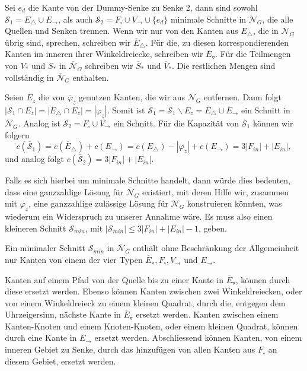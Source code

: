 Sei $e_{d}$ die Kante von der Dummy-Senke zu Senke 2, dann sind sowohl $\mathcal{S}_1 = E_\triangle \cup E_{\to}$, als auch $\mathcal{S}_2 = F_\square \cup V_{\to} \cup \{e_{d}\}$ minimale Schnitte in $\mathcal{N}_G$, die alle Quellen und Senken trennen. Wenn wir nur von den Kanten aus $E_\triangle$, die in $\overline{\mathcal{N}}_G$ übrig sind, sprechen, schreiben wir $\overline{E}_\triangle$. Für die, zu diesen korrespondierenden Kanten im inneren ihrer Winkeldreiecke, schreiben wir $\overline{E}_\triangledown$. Für die Teilmengen von $V_*$ und $S_*$ in $\overline{\mathcal{N}}_G$ schreiben wir $\overline{S}_*$ und $\overline{V}_*$. Die restlichen Mengen sind vollständig in $\overline{\mathcal{N}}_G$ enthalten.

Seien $E_z$ die von $\overline{\varphi}_z$ genutzen Kanten, die wir aus $\mathcal{N}_G$ entfernen. Dann folgt $|\mathcal{S}_1 \cap E_z| = |E_\triangle \cap E_z| = |\varphi_z|$. Somit ist $\overline{\mathcal{S}}_1 = \mathcal{S}_1 \backslash E_z = \overline{E}_\triangle \cup E_\to$ ein Schnitt in $\overline{\mathcal{N}}_G$. Analog ist $\overline{\mathcal{S}}_2 = F_\square \cup V_{\to}$ ein Schnitt. Für die Kapazität von $\overline{\mathcal{S}}_1$ können wir folgern 
$$ c(\overline{\mathcal{S}}_1) = c(\overline{E}_\triangle) + c(E_\to) = c(E_\triangle) - |\varphi_z| + c(E_\to) = 3|F_{in}| + |E_{in}|,$$
und analog folgt $c(\overline{\mathcal{S}}_2) = 3|F_{in}| + |E_{in}|$.

Falls es sich hierbei um minimale Schnitte handelt, dann würde dies bedeuten, dass eine ganzzahlige Lösung für $\overline{\mathcal{N}}_G$ existiert, mit deren Hilfe wir, zusammen mit $\varphi_z$, eine ganzzahlige zulässige Lösung für $\mathcal{N}_G$ konstruieren könnten, was wiederum ein Widerspruch zu unserer Annahme wäre. Es muss also einen kleineren Schnitt $\mathcal{S}_{min}$, mit $|\mathcal{S}_{min}| \leq 3|F_{in}| + |E_{in}| - 1$, geben. 

\begin{claim} \label{cut_types1}

Ein minimaler Schnitt $\mathcal{S}_{min}$ in $\overline{\mathcal{N}}_G$ enthält ohne Beschränkung der Allgemeinheit nur Kanten von einem der vier Typen $\overline{E}_\triangledown, F_\square, V_\to$ und $E_\to$.

\end{claim}

Kanten auf einem Pfad von der Quelle bis zu einer Kante in $\overline{E}_\triangledown$, können durch diese ersetzt werden. Ebenso können Kanten zwischen zwei Winkeldreiecken, oder von einem Winkeldreieck zu einem kleinen Quadrat, durch die, entgegen dem Uhrzeigersinn, nächste Kante in $\overline{E}_\triangledown$ ersetzt werden. Kanten zwischen einem Kanten-Knoten und einem Knoten-Knoten, oder einem kleinen Quadrat, können durch eine Kante in $E_\to$ ersetzt werden. Abschliessend können Kanten, von einem inneren Gebiet zu Senke, durch das hinzufügen von allen Kanten aus $F_\square$ an diesem Gebiet, ersetzt werden.

